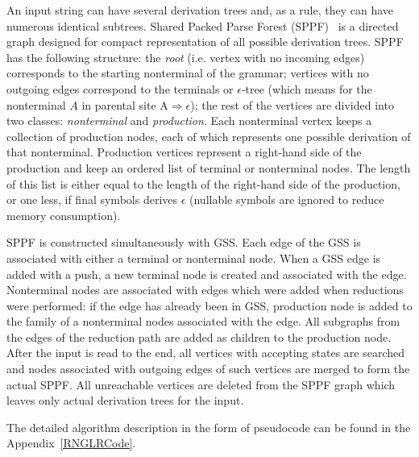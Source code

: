 An input string can have several derivation trees and, as a rule, they can have 
numerous identical subtrees. Shared Packed Parse Forest (SPPF)~\cite{SPPF} is a directed graph
designed for compact representation of all possible derivation trees.  
SPPF has the following structure: the \emph{root} (i.e. vertex with no incoming edges) corresponds 
to the starting nonterminal of the grammar; vertices with no outgoing edges correspond to the terminals 
or $\epsilon$-tree (which means for the nonterminal $A$ in parental site $\mathrm{A} \Rightarrow \epsilon$); 
the rest of the vertices are divided into two classes: \emph{nonterminal} and \emph{production}. 
Each nonterminal vertex keeps a collection of production nodes, each of which represents one  
possible derivation of that nonterminal. Production vertices represent a right-hand side of the 
production and keep an ordered list of terminal or nonterminal nodes. The length of this list is 
either equal to the length of the right-hand side of the production, or one less, if final 
symbols derives $\epsilon$ (nullable symbols are ignored to reduce memory consumption). 

SPPF is constructed simultaneously with GSS. Each edge of the GSS is associated with either 
a terminal or nonterminal node. When a GSS edge is added with a push, 
a new terminal node is created and associated with the edge. Nonterminal nodes are associated
with edges which were added when reductions were performed: if the edge has already been in GSS, 
production node is added to the family of a nonterminal nodes associated with the edge. All subgraphs 
from the edges of the reduction path are added as children to the production node. After the input 
is read to the end, all vertices with accepting states are searched and nodes associated with 
outgoing edges of such vertices are merged to form the actual SPPF. All unreachable vertices 
are deleted from the SPPF graph which leaves only actual derivation trees for the input.

The detailed algorithm description in the form of pseudocode can be found in the 
Appendix~\ref{RNGLRCode}. 

